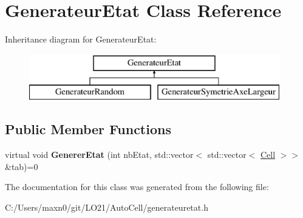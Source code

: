\hypertarget{class_generateur_etat}{}\section{Generateur\+Etat Class Reference}
\label{class_generateur_etat}
Inheritance diagram for Generateur\+Etat\+:\begin{figure}[H]
\begin{center}
\leavevmode
\includegraphics[height=2.000000cm]{class_generateur_etat}
\end{center}
\end{figure}
\subsection*{Public Member Functions}
\begin{DoxyCompactItemize}
\item 
\mbox{\label{class_generateur_etat_a5ef8cb45662e2fa220b7683774701c8f}} 
virtual void {\bfseries Generer\+Etat} (int nb\+Etat, std\+::vector$<$ std\+::vector$<$ \mbox{\hyperlink{class_cell}{Cell}} $>$$>$ \&tab)=0
\end{DoxyCompactItemize}


The documentation for this class was generated from the following file\+:\begin{DoxyCompactItemize}
\item 
C\+:/\+Users/maxn0/git/\+L\+O21/\+Auto\+Cell/generateuretat.\+h\end{DoxyCompactItemize}
